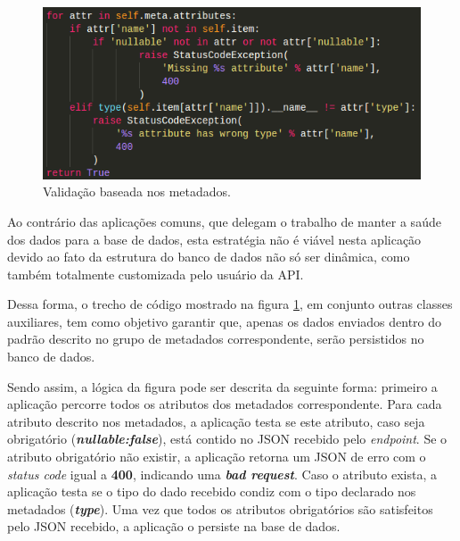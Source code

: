 \documentclass[12pt, openright, oneside, a4paper, brazil]{abntex2}
\begin{document}
\begin{figure}[h!tp]
	
	\caption{\label{validation}Validação baseada nos metadados.}

	\begin{center}
		\includegraphics[scale=0.83]{images/python_validation.png}
	\end{center}

	\hspace{5.5cm}{Fonte: O Autor.}

\end{figure}	

Ao contrário das aplicações comuns, que delegam o trabalho de manter a saúde dos dados para a base de dados, esta estratégia não é viável nesta aplicação devido ao fato da estrutura do banco de dados não só ser dinâmica, como também totalmente customizada pelo usuário da API. 

Dessa forma, o trecho de código mostrado na figura \ref{validation}, em conjunto outras classes auxiliares, tem como objetivo garantir que, apenas os dados enviados dentro do padrão descrito no grupo de metadados correspondente, serão persistidos no banco de dados.

Sendo assim, a lógica da figura pode ser descrita da seguinte forma: primeiro a aplicação percorre todos os atributos dos metadados correspondente. Para cada atributo descrito nos metadados, a aplicação testa se este atributo, caso seja obrigatório (\textbf{\textit{nullable:false}}), está contido no JSON recebido pelo \textit{endpoint}. Se o atributo obrigatório não existir, a aplicação retorna um JSON de erro com o \textit{status code} igual a \textbf{400}, indicando uma \textbf{\textit{bad request}}. Caso o atributo exista, a aplicação testa se o tipo do dado recebido condiz com o tipo declarado nos metadados (\textbf{\textit{type}}). Uma vez que todos os atributos obrigatórios são satisfeitos pelo JSON recebido, a aplicação o persiste na base de dados.
\end{document}
